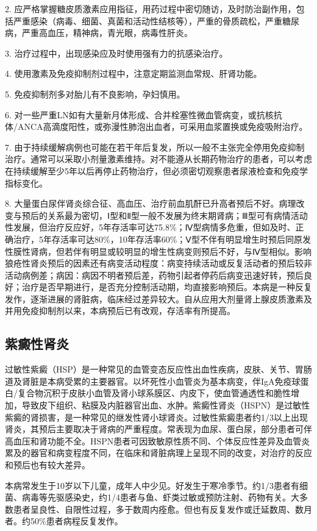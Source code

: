 2.
应严格掌握糖皮质激素应用指征，用药过程中密切随访，及时防治副作用，包括严重感染（病毒、细菌、真菌和活动性结核等），严重的骨质疏松，严重糖尿病，严重高血压，精神病，青光眼，病毒性肝炎。

3. 治疗过程中，出现感染应及时使用强有力的抗感染治疗。

4. 使用激素及免疫抑制剂过程中，注意定期监测血常规、肝肾功能。

5. 免疫抑制剂多对胎儿有不良影响，孕妇慎用。

6.
对一些严重LN如有大量新月体形成、合并栓塞性微血管病变，或抗核抗体/ANCA高滴度阳性，或弥漫性肺泡出血者，可采用血浆置换或免疫吸附治疗。

7.
由于持续缓解病例也可能在若干年后复发，所以一般不主张完全停用免疫抑制治疗。通常可以采取小剂量激素维持。对不能遵从长期药物治疗的患者，可以考虑在持续缓解至少5年以后再停止药物治疗，但必须密切观察患者尿液检查和免疫学指标变化。

8.
大量蛋白尿伴肾炎综合征、高血压、治疗前血肌酐已升高者预后不好。病理改变与预后的关系最为密切，Ⅰ型和Ⅱ型一般不发展为终末期肾病；Ⅲ型可有病情活动性发展，但治疗反应好，5年存活率可达75.8\%；Ⅳ型病情多危重，但如及时、正确治疗，5年存活率可达80\%，10年存活率60\%；Ⅴ型不伴有明显增生时预后同原发性膜性肾病，但若伴有明显或较明显的增生性病变则预后不好，与Ⅳ型相似。影响狼疮性肾炎预后的因素还有病变活动程度：病变持续活动或反复活动者的预后较非活动病例差；病因：病因不明者预后差，药物引起者停药后病变迅速好转，预后良好；治疗是否早期进行，是否充分控制活动期，均直接影响预后。本病是一种反复发作，逐渐进展的肾脏病，临床经过差异较大。自从应用大剂量肾上腺皮质激素及并用免疫抑制剂以来，本病预后已有改观，存活率有所提高。

\subsection{紫癜性肾炎}

过敏性紫癜（HSP）是一种常见的血管变态反应性出血性疾病，皮肤、关节、胃肠道及肾脏是本病受累的主要器官。以坏死性小血管炎为基本病变，伴IgA免疫球蛋白/复合物沉积于皮肤小血管及肾小球系膜区、内皮下，使血管通透性和脆性增加，导致皮下组织、粘膜及内脏器官出血、水肿。紫癜性肾炎（HSPN）是过敏性紫癜的肾损害，是一种常见的继发性肾小球肾炎。过敏性紫癜患者约1/3以上出现肾炎，其预后主要取决于肾病的严重程度。常表现为血尿、蛋白尿，部分患者可伴高血压和肾功能不全。HSPN患者可因致敏原性质不同、个体反应性差异及血管炎累及的器官和病变程度不同，在临床和肾脏病理上呈现不同的改变，对治疗的反应和预后也有较大差异。

本病常发生于10岁以下儿童，成年人中少见。好发生于寒冷季节。约1/3患者有细菌、病毒等先驱感染史，约1/4患者与鱼、虾类过敏或预防注射、药物有关。大多数患者呈良性、自限性过程，多于数周内痊愈。但也有反复发作或迁延数周、数月者。约50\%患者病程反复发作。

